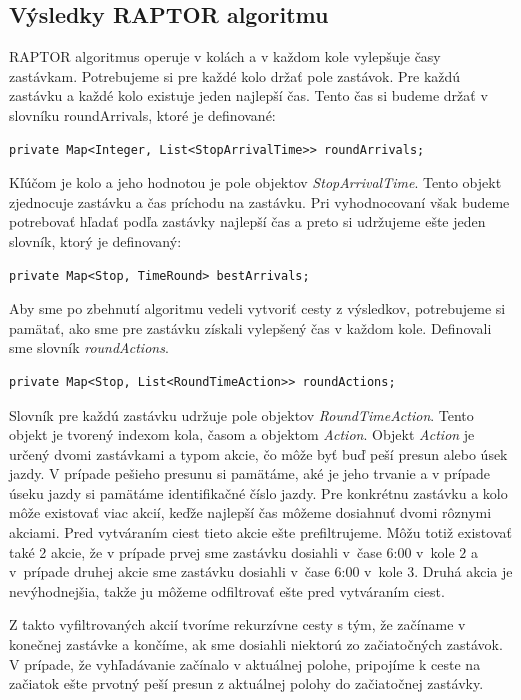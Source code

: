 \subsection{Výsledky RAPTOR algoritmu}
RAPTOR algoritmus operuje v kolách a v každom kole vylepšuje časy zastávkam. Potrebujeme si pre každé kolo držať pole zastávok. Pre každú zastávku a každé kolo existuje jeden najlepší čas. Tento čas si budeme držať v slovníku roundArrivals, ktoré je definované:
\begin{lstlisting}
private Map<Integer, List<StopArrivalTime>> roundArrivals; 
\end{lstlisting}
Kľúčom je kolo a jeho hodnotou je pole objektov \textit{StopArrivalTime}. Tento objekt zjednocuje zastávku a čas príchodu na zastávku. Pri vyhodnocovaní však budeme potrebovať hľadať podľa zastávky najlepší čas a preto si udržujeme ešte jeden slovník, ktorý je definovaný:
\begin{lstlisting}
private Map<Stop, TimeRound> bestArrivals;
\end{lstlisting}
Aby sme po zbehnutí algoritmu vedeli vytvoriť cesty z výsledkov, potrebujeme si pamätať, ako sme pre zastávku získali  vylepšený čas v každom kole. Definovali sme slovník \textit{roundActions}.
\begin{lstlisting}
private Map<Stop, List<RoundTimeAction>> roundActions;
\end{lstlisting}
Slovník pre každú zastávku udržuje pole objektov \textit{RoundTimeAction}. Tento objekt je tvorený indexom kola, časom a objektom \textit{Action}. Objekt \textit{Action} je určený dvomi zastávkami a typom akcie, čo môže byť buď peší presun alebo úsek jazdy. V prípade pešieho presunu si pamätáme, aké je jeho trvanie a v prípade úseku jazdy si pamätáme identifikačné číslo jazdy. Pre konkrétnu zastávku a kolo môže existovať viac akcií, keďže najlepší čas môžeme dosiahnuť dvomi rôznymi akciami. Pred vytváraním ciest tieto akcie ešte prefiltrujeme. Môžu totiž existovať také 2 akcie, že v prípade prvej sme zastávku dosiahli v~čase 6:00 v~kole $2$ a v~prípade druhej akcie sme zastávku dosiahli v~čase 6:00 v~kole $3$. Druhá akcia je nevýhodnejšia, takže ju môžeme odfiltrovať ešte pred vytváraním ciest.

Z takto vyfiltrovaných akcií tvoríme rekurzívne cesty s tým, že začíname v konečnej zastávke a končíme, ak sme dosiahli niektorú zo začiatočných zastávok. V prípade, že vyhľadávanie začínalo v aktuálnej polohe, pripojíme k ceste na začiatok ešte prvotný peší presun z aktuálnej polohy do začiatočnej zastávky.


